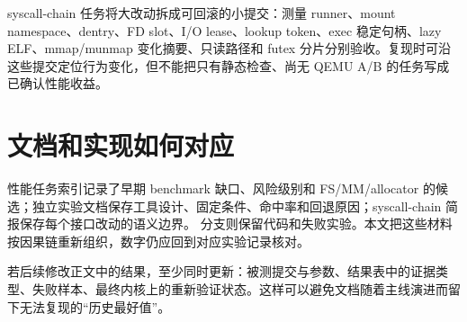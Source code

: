 syscall-chain 任务将大改动拆成可回滚的小提交：测量 runner、mount namespace、dentry、FD slot、I/O lease、lookup token、exec 稳定句柄、lazy ELF、mmap/munmap 变化摘要、只读路径和 futex 分片分别验收。复现时可沿这些提交定位行为变化，但不能把只有静态检查、尚无 QEMU A/B 的任务写成已确认性能收益。

\section{文档和实现如何对应}

性能任务索引记录了早期 benchmark 缺口、风险级别和 FS/MM/allocator 的候选；独立实验文档保存工具设计、固定条件、命中率和回退原因；syscall-chain 简报保存每个接口改动的语义边界。 分支则保留代码和失败实验。本文把这些材料按因果链重新组织，数字仍应回到对应实验记录核对。

若后续修改正文中的结果，至少同时更新：被测提交与参数、结果表中的证据类型、失败样本、最终内核上的重新验证状态。这样可以避免文档随着主线演进而留下无法复现的“历史最好值”。
